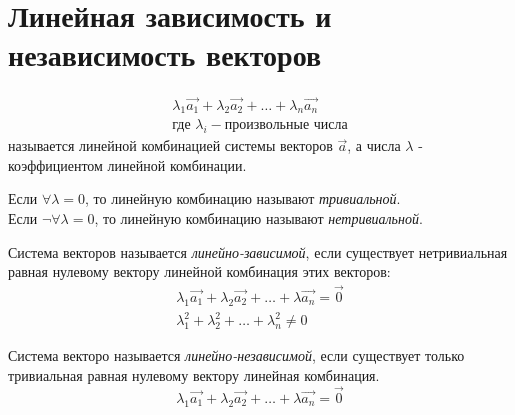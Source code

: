 \section{Линейная зависимость и независимость векторов}

\begin{definition}
  \begin{gather*}
    \lambda_1 \vec{a_1} + \lambda_2 \vec{a_2} + \ldots + \lambda_n \vec{a_n} \\
    \text{где } \lambda_i - \text{произвольные числа}
  \end{gather*}
  называется линейной комбинацией системы векторов $\vec{a}$, а числа $\lambda$ - коэффициентом линейной комбинации.  \\
\end{definition}

Если $\forall \lambda = 0$, то линейную комбинацию называют \textit{тривиальной}. \\
Если $\neg \forall \lambda = 0$, то линейную комбинацию называют \textit{нетривиальной}. 

\begin{definition}
Система векторов называется \textit{линейно-зависимой}, если существует нетривиальная равная нулевому вектору линейной комбинация этих векторов:
  \begin{gather*}
    \lambda_1 \vec{a_1} + \lambda_2 \vec{a_2} + \ldots + \lambda \vec{a_n} = \vec{0} \\
    \lambda_1^2 + \lambda_2^2 + \ldots + \lambda_n^2 \neq 0
  \end{gather*}
\end{definition}

\begin{definition}
  Система векторо называется \textit{линейно-независимой}, если существует только тривиальная равная нулевому вектору линейная комбинация.
  \[
    \lambda_1 \vec{a_1} + \lambda_2 \vec{a_2} + \ldots + \lambda \vec{a_n} = \vec{0}
  \] 
\end{definition}


